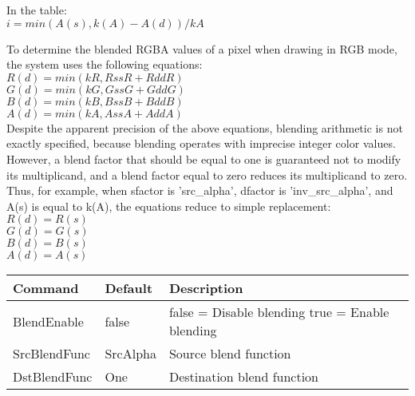 In the table:\\
\( i = min( A(s), k(A)-A(d) ) / kA \)\\
\pagebreak

To determine the blended RGBA values of a pixel when drawing in RGB mode,
the system uses the following equations:\\
\( R(d) = min(kR, RssR+RddR) \)\\
\( G(d) = min(kG, GssG+GddG) \)\\
\( B(d) = min(kB, BssB+BddB) \)\\
\( A(d) = min(kA, AssA+AddA) \)\\

Despite the apparent precision of the above equations, blending arithmetic is not exactly specified,
because blending operates with imprecise integer color values. However, a blend factor that should
be equal to one is guaranteed not to modify its multiplicand, and a blend factor equal to zero
reduces its multiplicand to zero. Thus, for example, when sfactor is 'src\_alpha', dfactor is
'inv\_src\_alpha', and A(s) is equal to k(A), the equations reduce to simple replacement:\\
\( R (d) = R (s) \)\\
\( G (d) = G (s) \)\\
\( B (d) = B (s) \)\\
\( A (d) = A (s) \)\\

\begin{tabular}{|p{4.5cm}|p{3cm}|p{9cm}|}
\hline
\textbf{Command} & \textbf{Default} & \textbf{Description}\\
\hline
BlendEnable  & false    & false = Disable blending\newline
                          true  = Enable blending\\
\hline
SrcBlendFunc & SrcAlpha & Source blend function\\
\hline
DstBlendFunc & One      & Destination blend function\\
\hline
\end{tabular}
\\

